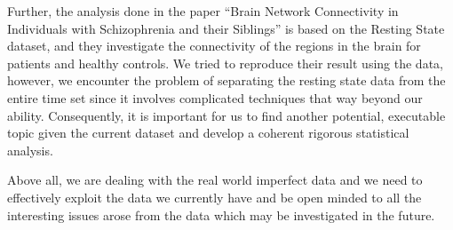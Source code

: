 \documentclass[11pt]{article}
\begin{document}
Further, the analysis done in the paper  “Brain Network Connectivity in
Individuals with Schizophrenia and their Siblings” is based on the Resting State
dataset, and they investigate the connectivity of the regions in the brain for
patients and healthy controls. We tried to reproduce their result using the
data, however, we encounter the problem of separating the resting state data
from the entire time set since it involves complicated techniques that way
beyond our ability. Consequently, it is important for us to find another
potential, executable topic given the current dataset and develop a coherent
rigorous statistical analysis.

Above all, we are dealing with the real world imperfect data and we need to
effectively exploit the data we currently have and be open minded to all the
interesting issues arose from the data which may be investigated in the future.


\end{document}
